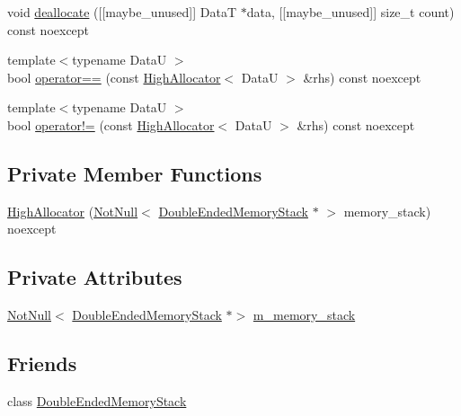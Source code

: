 \begin{DoxyCompactItemize}
\item 
void \hyperlink{classmage_1_1_double_ended_memory_stack_1_1_high_allocator_a83581ea8c009f8fa5b623be7ffeb6c53}{deallocate} (\mbox{[}\mbox{[}maybe\+\_\+unused\mbox{]}\mbox{]} DataT $\ast$data, \mbox{[}\mbox{[}maybe\+\_\+unused\mbox{]}\mbox{]} size\+\_\+t count) const noexcept
\item 
{\footnotesize template$<$typename DataU $>$ }\\bool \hyperlink{classmage_1_1_double_ended_memory_stack_1_1_high_allocator_a452887cb961e5a0f6919d0497c0e2617}{operator==} (const \hyperlink{classmage_1_1_double_ended_memory_stack_1_1_high_allocator}{High\+Allocator}$<$ DataU $>$ \&rhs) const noexcept
\item 
{\footnotesize template$<$typename DataU $>$ }\\bool \hyperlink{classmage_1_1_double_ended_memory_stack_1_1_high_allocator_a3857539e5308e88fb0454ecab7bbeda8}{operator!=} (const \hyperlink{classmage_1_1_double_ended_memory_stack_1_1_high_allocator}{High\+Allocator}$<$ DataU $>$ \&rhs) const noexcept
\end{DoxyCompactItemize}
\subsection*{Private Member Functions}
\begin{DoxyCompactItemize}
\item 
\hyperlink{classmage_1_1_double_ended_memory_stack_1_1_high_allocator_a6903aacd7e38597edb9145e73f3099be}{High\+Allocator} (\hyperlink{namespacemage_a8769f9d670d6b585ea306cb1062af94b}{Not\+Null}$<$ \hyperlink{classmage_1_1_double_ended_memory_stack}{Double\+Ended\+Memory\+Stack} $\ast$ $>$ memory\+\_\+stack) noexcept
\end{DoxyCompactItemize}
\subsection*{Private Attributes}
\begin{DoxyCompactItemize}
\item 
\hyperlink{namespacemage_a8769f9d670d6b585ea306cb1062af94b}{Not\+Null}$<$ \hyperlink{classmage_1_1_double_ended_memory_stack}{Double\+Ended\+Memory\+Stack} $\ast$$>$ \hyperlink{classmage_1_1_double_ended_memory_stack_1_1_high_allocator_a5210ee9e229a0d91fc159ea3abb5fcbf}{m\+\_\+memory\+\_\+stack}
\end{DoxyCompactItemize}
\subsection*{Friends}
\begin{DoxyCompactItemize}
\item 
class \hyperlink{classmage_1_1_double_ended_memory_stack_1_1_high_allocator_a10ae729d55b8c0017057250445835680}{Double\+Ended\+Memory\+Stack}
\end{DoxyCompactItemize}


